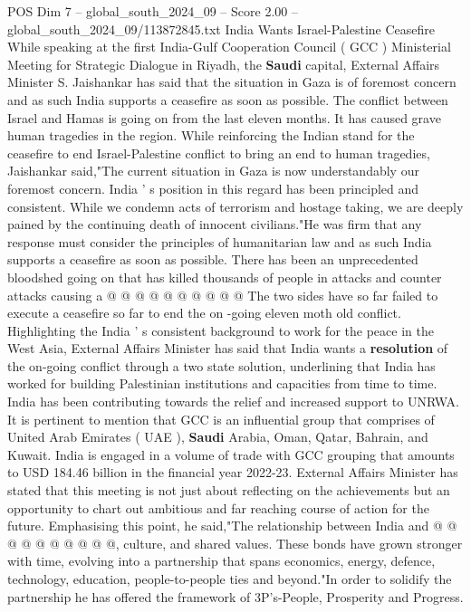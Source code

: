 \begin{textsample}{POS Dim 7 – global\_south\_2024\_09 – Score 2.00 – global\_south\_2024\_09/113872845.txt}  \label{ex:f7_pos_271}
India Wants Israel-Palestine Ceasefire While speaking at the first India-Gulf Cooperation Council ( GCC ) Ministerial Meeting for Strategic Dialogue in Riyadh, the \textbf{Saudi} capital, External Affairs Minister S.
Jaishankar has said that the situation in Gaza is of foremost concern and as such India supports a ceasefire as soon as possible.
The conflict between Israel and Hamas is going on from the last eleven months.
It has caused grave human tragedies in the region.
While reinforcing the Indian stand for the ceasefire to end Israel-Palestine conflict to bring an end to human tragedies, Jaishankar said,"The current situation in Gaza is now understandably our foremost concern.
India ' s position in this regard has been principled and consistent.
While we condemn acts of terrorism and hostage taking, we are deeply pained by the continuing death of innocent civilians."He was firm that any response must consider the principles of humanitarian law and as such India supports a ceasefire as soon as possible.
There has been an unprecedented bloodshed going on that has killed thousands of people in attacks and counter attacks causing a @ @ @ @ @ @ @ @ @ @ The two sides have so far failed to execute a ceasefire so far to end the on -going eleven moth old conflict.
Highlighting the India ' s consistent background to work for the peace in the West Asia, External Affairs Minister has said that India wants a \textbf{resolution} of the on-going conflict through a two state solution, underlining that India has worked for building Palestinian institutions and capacities from time to time.
India has been contributing towards the relief and increased support to UNRWA.
It is pertinent to mention that GCC is an influential group that comprises of United Arab Emirates ( UAE ), \textbf{Saudi} Arabia, Oman, Qatar, Bahrain, and Kuwait.
India is engaged in a volume of trade with GCC grouping that amounts to USD 184.46 billion in the financial year 2022-23.
External Affairs Minister has stated that this meeting is not just about reflecting on the achievements but an opportunity to chart out ambitious and far reaching course of action for the future.
Emphasising this point, he said,"The relationship between India and @ @ @ @ @ @ @ @ @ @, culture, and shared values.
These bonds have grown stronger with time, evolving into a partnership that spans economics, energy, defence, technology, education, people-to-people ties and beyond."In order to solidify the partnership he has offered the framework of 3P's-People, Prosperity and Progress.

\end{textsample}
